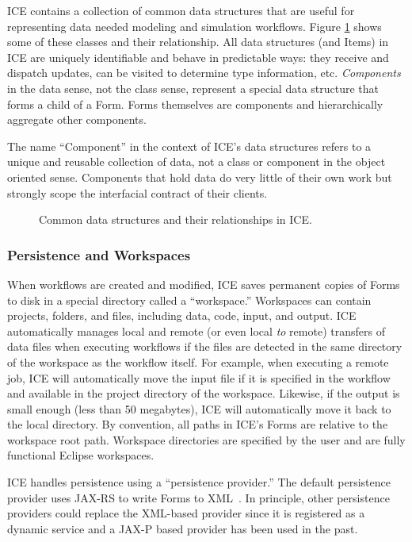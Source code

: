 ICE contains a collection of common data structures that are useful for representing data needed modeling and simulation workflows. Figure \ref{data-arch} shows some of these classes and their relationship. All data structures (and Items) in ICE are uniquely identifiable and behave in predictable ways: they receive and dispatch updates, can be visited to determine type information, etc. \textit{Components} in the data sense, not the class sense, represent a special data structure that forms a child of a Form. Forms themselves are components and hierarchically aggregate other components.

The name ``Component'' in the context of ICE's data structures refers to a unique and reusable collection of data, not a class or component in the object oriented sense. Components that hold data do very little of their own work but strongly scope the interfacial contract of their clients.

\begin{figure}[htbp]
\centering
{}
\caption{Common data structures and their relationships in ICE.}
\label{data-arch}
\end{figure}

\subsubsection{Persistence and
Workspaces}\label{persistence-and-workspaces}

When workflows are created and modified, ICE saves permanent copies of 
Forms to disk in a special directory called a ``workspace.''
Workspaces can contain projects, folders, and files, including data,
code, input, and output. ICE automatically manages local and remote (or
even local \emph{to} remote) transfers of data files when executing
workflows if the files are detected in the same directory of the
workspace as the workflow itself. For example, when executing a remote
job, ICE will automatically move the input file if it is specified in
the workflow and available in the project directory of the workspace.
Likewise, if the output is small enough (less than 50 megabytes), ICE will automatically move it back
to the local directory. By convention, all paths in ICE's Forms are
relative to the workspace root path. Workspace directories are specified
by the user and are fully functional Eclipse workspaces.

ICE handles persistence using a ``persistence provider.'' The
default persistence provider uses JAX-RS to write Forms to 
XML~\cite{burke_restful_2010}. In principle, other persistence providers 
could replace the XML-based provider since it is registered as a dynamic 
service and a JAX-P based provider has been used in the past.

